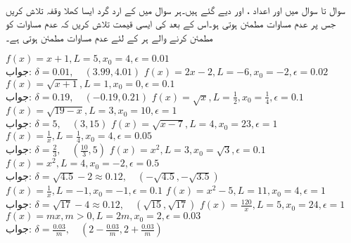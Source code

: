 \\
سوال  تا سوال  میں  اور اعداد  ،  اور  دیے گئے ہیں۔ہر سوال میں  کے ارد گرد ایسا کھلا وقفہ تلاش کریں جس پر عدم مساوات  مطمئن ہوتی ہو۔اس کے بعد   کی ایسی قیمت تلاش کریں کہ  عدم مساوات  کو مطمئن کرنے والے ہر  کے لئے عدم مساوات  مطمئن ہوتی ہے۔ 

$f(x)=x+1,L=5,x_0=4,\epsilon=0.01$\\
جواب:\quad
$\delta=0.01,\quad (3.99,4.01)$
$f(x)=2x-2,L=-6,x_0=-2,\epsilon=0.02$
$f(x)=\sqrt{x+1},L=1,x_0=0,\epsilon=0.1$\\
جواب:\quad
$\delta=0.19,\quad (-0.19,0.21)$
$f(x)=\sqrt{x},L=\tfrac{1}{2},x_0=\tfrac{1}{4},\epsilon=0.1$
$f(x)=\sqrt{19-x},L=3,x_0=10,\epsilon=1$\\
جواب:\quad
$\delta=5,\quad (3,15)$
$f(x)=\sqrt{x-7},L=4,x_0=23,\epsilon=1$
$f(x)=\tfrac{1}{x},L=\tfrac{1}{4},x_0=4,\epsilon=0.05$\\
جواب:\quad
$\delta=\tfrac{2}{3},\quad (\tfrac{10}{3},5)$
$f(x)=x^2,L=3,x_0=\sqrt{3},\epsilon=0.1$
$f(x)=x^2,L=4,x_0=-2,\epsilon=0.5$\\
جواب:\quad
$\delta=\sqrt{4.5}-2\approx 0.12,\quad (-\sqrt{4.5},-\sqrt{3.5})$
$f(x)=\tfrac{1}{x},L=-1,x_0=-1,\epsilon=0.1$
$f(x)=x^2-5,L=11,x_0=4,\epsilon=1$\\
جواب:\quad
$\delta=\sqrt{17}-4\approx 0.12,\quad (\sqrt{15},\sqrt{17})$
$f(x)=\tfrac{120}{x},L=5,x_0=24,\epsilon=1$
$f(x)=mx,m>0,L=2m,x_0=2,\epsilon=0.03$\\
جواب:\quad
$\delta=\tfrac{0.03}{m},\quad (2-\tfrac{0.03}{m},2+\tfrac{0.03}{m})$
